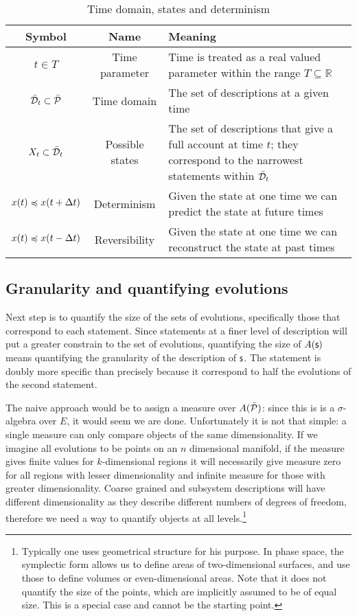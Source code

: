 \documentclass[letterpaper]{article}
\begin{document}
\begin{table}[h!]
	\centering
	\begin{tabular}[h]{|c|c|p{6cm}|}
		\hline 
		Symbol & Name & Meaning \\ 
		\hline 
		$t \in T$ & Time parameter & Time is treated as a real valued parameter within the range $T \subseteq \mathbb{R}$ \\ 
		\hline 
		$\tdomain_t \subset \tdomain[P]$ & Time domain & The set of descriptions at a given time \\ 
		\hline 
		$X_t \subset \tdomain_t$ & Possible states & The set of descriptions that give a full account at time $t$; they correspond to the narrowest statements within $\tdomain_t$ \\ 
		\hline 
		$x(t) \narrower x(t + \Delta t)$ & Determinism & Given the state at one time we can predict the state at future times \\ 
		\hline 
		$x(t) \narrower x(t - \Delta t)$ & Reversibility & Given the state at one time we can reconstruct the state at past times \\ 
		\hline 
	\end{tabular} 
	\caption{Time domain, states and determinism}
	\label{table:states}
\end{table}

\subsection{Granularity and quantifying evolutions}

Next step is to quantify the size of the sets of evolutions, specifically those that correspond to each statement. Since statements at a finer level of description will put a greater constrain to the set of evolutions, quantifying the size of $A(\stmt)$ means quantifying the granularity of the description of $\stmt$. The statement  is doubly more specific than  precisely because it correspond to half the evolutions of the second statement.

The naive approach would be to assign a measure over $A(\tdomain[P])$: since this is is a $\sigma$-algebra over $E$, it would seem we are done. Unfortunately it is not that simple: a single measure can only compare objects of the same dimensionality. If we imagine all evolutions to be points on an $n$ dimensional manifold, if the measure gives finite values for $k$-dimensional regions it will necessarily give measure zero for all regions with lesser dimensionality and infinite measure for those with greater dimensionality. Coarse grained and subsystem descriptions will have different dimensionality as they describe different numbers of degrees of freedom, therefore we need a way to quantify objects at all levels.\footnote{Typically one uses geometrical structure for his purpose. In phase space, the symplectic form allows us to define areas of two-dimensional surfaces, and use those to define volumes or even-dimensional areas. Note that it does not quantify the size of the points, which are implicitly assumed to be of equal size. This is a special case and cannot be the starting point.}
\end{document}
